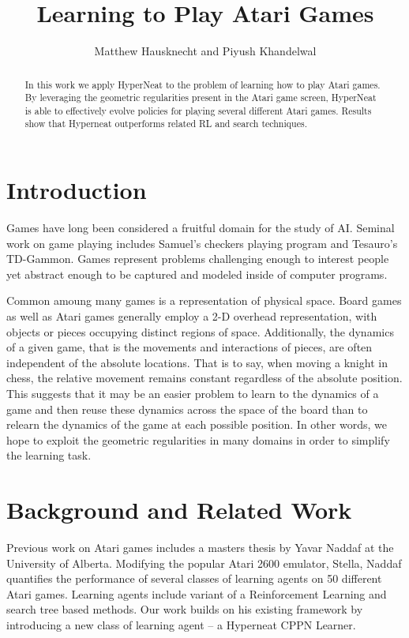 \documentclass{article}
\begin{document}
\title{Learning to Play Atari Games}
\author{Matthew Hausknecht and Piyush Khandelwal}

\maketitle

\begin{abstract}
In this work we apply HyperNeat to the problem of learning how to play Atari games. By leveraging the geometric regularities present in the Atari game screen, HyperNeat is able to effectively evolve policies for playing several different Atari games. Results show that Hyperneat outperforms related RL and search techniques.
\end{abstract}

\section{Introduction}
Games have long been considered a fruitful domain for the study of AI. Seminal work on game playing includes Samuel's checkers playing program\cite{samuel_59} and Tesauro's TD-Gammon\cite{tesauro_94}. Games represent problems challenging enough to interest people yet abstract enough to be captured and modeled inside of computer programs. 

Common amoung many games is a representation of physical space. Board games as well as Atari games generally employ a 2-D overhead representation, with objects or pieces occupying distinct regions of space. Additionally, the dynamics of a given game, that is the movements and interactions of pieces, are often independent of the absolute locations. That is to say, when moving a knight in chess, the relative movement remains constant regardless of the absolute position. This suggests that it may be an easier problem to learn to the dynamics of a game and then reuse these dynamics across the space of the board than to relearn the dynamics of the game at each possible position. In other words, we hope to exploit the geometric regularities in many domains in order to simplify the learning task.

\section{Background and Related Work}
Previous work on Atari games includes a masters thesis by Yavar Naddaf\cite{naddaf10} at the University of Alberta. Modifying the popular Atari 2600 emulator, Stella, Naddaf quantifies the performance of several classes of learning agents on 50 different Atari games. Learning agents include variant of a Reinforcement Learning and search tree based methods. Our work builds on his existing framework by introducing a new class of learning agent -- a Hyperneat CPPN Learner. 
\end{document}
